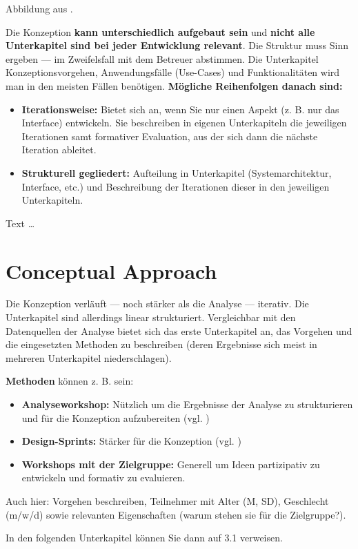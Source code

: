 \documentclass[11pt,a4paper,english]{scrreprt}
\newenvironment{comment}
  {\par\medskip
   \begingroup\color{olive}%
   }
 {\endgroup
  \medskip}
\begin{document}
\begin{comment}
Abbildung aus \textcite{greenberg_2012}.

Die Konzeption \textbf{kann unterschiedlich aufgebaut sein} und \textbf{nicht alle Unterkapitel sind bei jeder Entwicklung relevant}. Die Struktur muss Sinn ergeben — im Zweifelsfall mit dem Betreuer abstimmen. Die Unterkapitel Konzeptionsvorgehen, Anwendungsfälle (Use-Cases) und Funktionalitäten wird man in den meisten Fällen benötigen. \textbf{Mögliche Reihenfolgen danach sind:}

\begin{itemize}
    \item \textbf{Iterationsweise:} Bietet sich an, wenn Sie nur einen Aspekt (z. B. nur das Interface) entwickeln. Sie beschreiben in eigenen Unterkapiteln die jeweiligen Iterationen samt formativer Evaluation, aus der sich dann die nächste Iteration ableitet.
    \item \textbf{Strukturell gegliedert:} Aufteilung in Unterkapitel (Systemarchitektur, Interface, etc.) und Beschreibung der Iterationen dieser in den jeweiligen Unterkapiteln.
\end{itemize}
\end{comment}

Text \dots

\section{Conceptual Approach}
\begin{comment}
Die Konzeption verläuft — noch stärker als die Analyse — iterativ. Die Unterkapitel sind allerdings linear strukturiert. Vergleichbar mit den Datenquellen der Analyse bietet sich das erste Unterkapitel an, das Vorgehen und die eingesetzten Methoden zu beschreiben (deren Ergebnisse sich meist in mehreren Unterkapitel niederschlagen).

\textbf{Methoden} können z. B. sein:

\begin{itemize}
    \item \textbf{Analyseworkshop:} Nützlich um die Ergebnisse der Analyse zu strukturieren und für die Konzeption aufzubereiten (vgl. \textcite[S. 190-192]{kumar_2013})
    \item \textbf{Design-Sprints:} Stärker für die Konzeption (vgl. \textcite{knapp_2016})
    \item \textbf{Workshops mit der Zielgruppe:} Generell um Ideen partizipativ zu entwickeln und formativ zu evaluieren.
\end{itemize}

Auch hier: Vorgehen beschreiben, Teilnehmer mit Alter (M, SD), Geschlecht (m/w/d) sowie relevanten Eigenschaften (warum stehen sie für die Zielgruppe?).

In den folgenden Unterkapitel können Sie dann auf 3.1 verweisen.
\end{comment}
\end{document}
